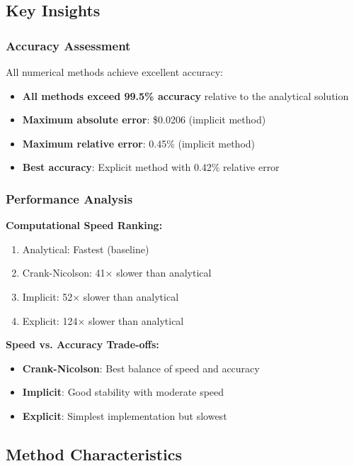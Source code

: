 \documentclass[12pt,a4paper]{article}
\numberwithin{algorithm}{subsection}
\begin{document}
\subsection{Key Insights}

\subsubsection{Accuracy Assessment}

All numerical methods achieve excellent accuracy:
\begin{itemize}
\item \textbf{All methods exceed 99.5\% accuracy} relative to the analytical solution
\item \textbf{Maximum absolute error}: \$0.0206 (implicit method)
\item \textbf{Maximum relative error}: 0.45\% (implicit method)
\item \textbf{Best accuracy}: Explicit method with 0.42\% relative error
\end{itemize}

\subsubsection{Performance Analysis}

\textbf{Computational Speed Ranking:}
\begin{enumerate}
\item Analytical: Fastest (baseline)
\item Crank-Nicolson: 41× slower than analytical
\item Implicit: 52× slower than analytical  
\item Explicit: 124× slower than analytical
\end{enumerate}

\textbf{Speed vs. Accuracy Trade-offs:}
\begin{itemize}
\item \textbf{Crank-Nicolson}: Best balance of speed and accuracy
\item \textbf{Implicit}: Good stability with moderate speed
\item \textbf{Explicit}: Simplest implementation but slowest
\end{itemize}

\subsection{Method Characteristics}
\end{document}
